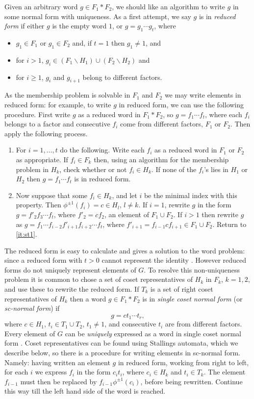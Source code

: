 \documentclass[a4paper,12pt]{article}
\numberwithin{equation}{section}
\numberwithin{figure}{section}
\newcommand{\be}{\begin{enumerate}}
\newcommand{\ee}{\end{enumerate}}
\begin{document}
Given an arbitrary word $g\in F_1\ast F_2$,
we should like an algorithm to write $g$ in 
some normal form with uniqueness. As a first attempt, 
 we say $g$ is in \emph{reduced form} if either $g$ is the empty word $1$, or $g = g_1 \cdots g_t$, where
\begin{itemize}
\item 
$g_1 \in F_1$ or $g_1 \in F_2$ and, if $t=1$ then $g_1\neq 1$,  and 
\item 
for
$i > 1$,    $g_i \in (F_1 \backslash H_1)\cup (F_2\backslash H_2)$ and
\item for $i\ge 1$,   $g_i$
and  ${g_{i+1}}$ belong to  different factors. 
\end{itemize}
As the membership problem
is solvable in $F_1$ and $F_2$ we may write elements in reduced form: for example, 
to write $g$ in reduced form,
we can use the following procedure. 
First write $g$  as a reduced word in $F_1\ast F_2$, so $g=f_1\cdots f_t$, where
each $f_i$ belongs to a factor and 
consecutive $f_i$ come from different factors, $F_1$ or $F_2$. Then apply the
following process. 
\be[Step 1]
\item\label{it:st1} For $i=1,\ldots ,t$ do the following.
Write each $f_i$ as  a reduced word in $F_1$ or $F_2$ as appropriate.  
If $f_i\in F_k$ then,  
using an algorithm for the membership problem in $H_k$, check whether or not $f_i \in H_k$.
 If none of the $f_i$'s lies in $H_1$ or $H_2$ then
$g= f_1 \cdots f_t$ is in  reduced form.  
\item  Now suppose that some $f_i \in H_k$,  and let  $i$ be the
minimal index with this property. Then $\phi^{\pm 1}(f_i)=c\in H_{l}$, $l\neq k$.  
If $i = 1$, rewrite $g$  in the
form $g = f'_2 f_3 \cdots f_t$,  where  $f'_2 = cf_2$, an element of $F_1\cup F_2$.  
If $i > 1$ then rewrite $g$ as
$g = f_1 \cdots f_{i-2} f'_{i+1}f_{i+2} \cdots f_t$, where
$f'_{i+1} = f_{i-1}c f_{i+1}\in F_1\cup F_2$. Return to 
\ref{it:st1}.
\ee

The reduced form is easy to calculate and gives a solution to the word problem: since
a reduced form with $t>0$ cannot represent the identity \cite[Theorem 2.6]{LS}. 
However reduced forms do not uniquely represent  
 elements of $G$. To resolve this non-uniqueness problem it is common to 
chose a set of coset representatives of $H_k$ in $F_k$, $k=1,2$, and use these to rewrite
the reduced form. If $T_k$ is a set of right coset representatives of $H_k$ then 
 a word $g\in F_1\ast F_2$ is in \emph{single coset normal form} (or \emph{sc-normal form}) if 
\[g=ct_1\cdots t_r,\]
where $c\in H_1$, $t_i\in T_1\cup T_2$, $t_1\neq 1$, and consecutive $t_i$ are from 
different factors. Every element of $G$ can be \emph{uniquely} expressed as a word in single coset
normal form \cite[Theorem 4.4]{MKS}. 
Coset representatives can be found using Stallings automata, which we describe below, so
there is a procedure for writing elements in sc-normal form. Namely: 
having written an element $g$ in reduced form, 
working from right to left, for each $i$  
 we express $f_i$ in the 
form $c_it_i$, where $c_i\in H_k$ and $t_i\in T_k$. The element $f_{i-1}$ must then be replaced
by $f_{i-1}\phi^{\pm 1}(c_i)$, before being rewritten. Continue this way till the
left hand side of the word is reached. 
\end{document}
